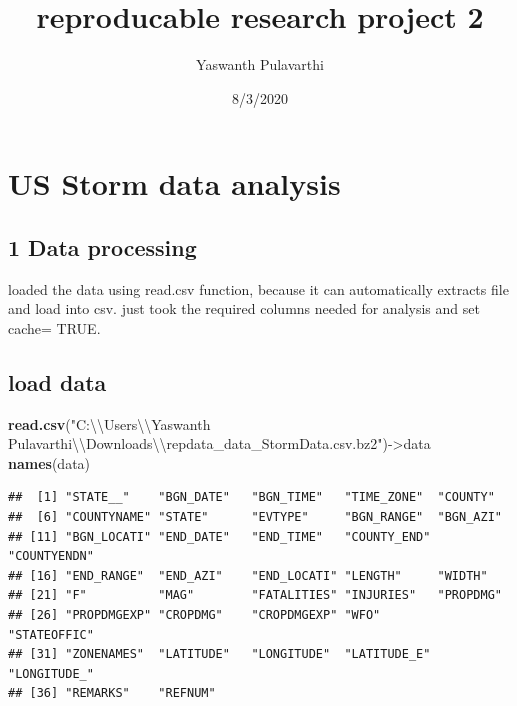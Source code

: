 \documentclass[
]{article}
\title{reproducable research project 2}
\author{Yaswanth Pulavarthi}
\date{8/3/2020}
\newenvironment{Shaded}{\begin{snugshade}}{\end{snugshade}}
\newcommand{\CharTok}[1]{\textcolor[rgb]{0.31,0.60,0.02}{#1}}
\newcommand{\KeywordTok}[1]{\textcolor[rgb]{0.13,0.29,0.53}{\textbf{#1}}}
\newcommand{\NormalTok}[1]{#1}
\newcommand{\StringTok}[1]{\textcolor[rgb]{0.31,0.60,0.02}{#1}}
\begin{document}
\maketitle

\hypertarget{us-storm-data-analysis}{%
\section{US Storm data analysis}\label{us-storm-data-analysis}}

\hypertarget{data-processing}{%
\subsection{1 Data processing}\label{data-processing}}

loaded the data using read.csv function, because it can automatically
extracts file and load into csv. just took the required columns needed
for analysis and set cache= TRUE.

\hypertarget{load-data}{%
\subsection{load data}\label{load-data}}

\begin{Shaded}
\begin{Highlighting}[]
\KeywordTok{read.csv}\NormalTok{(}\StringTok{"C:}\CharTok{\textbackslash{}\textbackslash{}}\StringTok{Users}\CharTok{\textbackslash{}\textbackslash{}}\StringTok{Yaswanth Pulavarthi}\CharTok{\textbackslash{}\textbackslash{}}\StringTok{Downloads}\CharTok{\textbackslash{}\textbackslash{}}\StringTok{repdata_data_StormData.csv.bz2"}\NormalTok{)->data}
\KeywordTok{names}\NormalTok{(data)}
\end{Highlighting}
\end{Shaded}

\begin{verbatim}
##  [1] "STATE__"    "BGN_DATE"   "BGN_TIME"   "TIME_ZONE"  "COUNTY"    
##  [6] "COUNTYNAME" "STATE"      "EVTYPE"     "BGN_RANGE"  "BGN_AZI"   
## [11] "BGN_LOCATI" "END_DATE"   "END_TIME"   "COUNTY_END" "COUNTYENDN"
## [16] "END_RANGE"  "END_AZI"    "END_LOCATI" "LENGTH"     "WIDTH"     
## [21] "F"          "MAG"        "FATALITIES" "INJURIES"   "PROPDMG"   
## [26] "PROPDMGEXP" "CROPDMG"    "CROPDMGEXP" "WFO"        "STATEOFFIC"
## [31] "ZONENAMES"  "LATITUDE"   "LONGITUDE"  "LATITUDE_E" "LONGITUDE_"
## [36] "REMARKS"    "REFNUM"
\end{verbatim}
\end{document}
